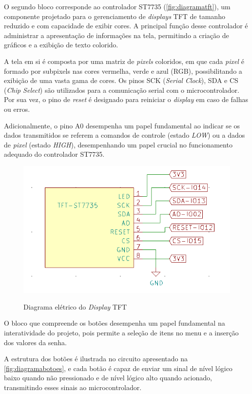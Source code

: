 O segundo bloco corresponde ao controlador ST7735 (\autoref{fig:diagramatft}), 
um componente projetado para o gerenciamento de \textit{displays} TFT de tamanho 
reduzido e com capacidade de exibir cores. A principal função desse 
controlador é administrar a apresentação de informações na tela, 
permitindo a criação de gráficos e a exibição de texto colorido.

A tela em si é composta por uma matriz de \textit{pixels} coloridos, em que 
cada \textit{pixel} é formado por subpixels nas cores vermelha, verde e azul 
(RGB), possibilitando a exibição de uma vasta gama de cores. Os pinos 
SCK (\textit{Serial Clock}), SDA e CS (\textit{Chip Select}) são utilizados para a 
comunicação serial com o microcontrolador. Por sua vez, o pino de 
\textit{reset} é designado para reiniciar o \textit{display} em caso de falhas ou erros.

Adicionalmente, o pino A0 desempenha um papel fundamental ao indicar 
se os dados transmitidos se referem a comandos de controle (estado \textit{LOW}) 
ou a dados de \textit{pixel} (estado \textit{HIGH}), desempenhando um papel crucial no 
funcionamento adequado do controlador ST7735.

\begin{figure}[h!]
    \centering
    \caption{Diagrama elétrico do \textit{Display} TFT}
    \includegraphics[scale=0.36]{figuras/modulo_tft.png}
    \fonte{}%
    \label{fig:diagramatft}
    \centering
\end{figure}

O bloco que compreende os botões desempenha um papel fundamental na 
interatividade do projeto, pois permite a seleção de itens no menu 
e a inserção dos valores da senha. 

A estrutura dos botões é 
ilustrada no circuito apresentado na \autoref{fig:diagramabotoes}, e 
cada botão é capaz de enviar um sinal de nível lógico baixo quando não 
pressionado e de nível lógico alto quando acionado, transmitindo esses 
sinais ao microcontrolador.

